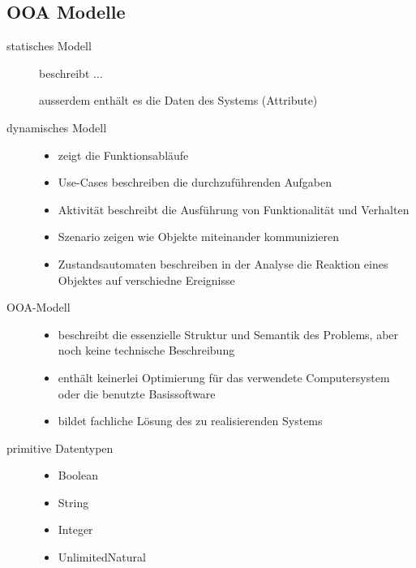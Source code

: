 \subsection{OOA Modelle}
  \begin{description}
    \item[statisches Modell] 
      beschreibt $\ldots$
      ausserdem enthält es die Daten des Systems (Attribute)
     
    \item[dynamisches Modell]
      \begin{itemize}[leftmargin=0.5cm]
        \item zeigt die Funktionsabläufe
        \item Use-Cases beschreiben die durchzuführenden Aufgaben
        \item Aktivität beschreibt die Ausführung von Funktionalität und Verhalten
        \item Szenario zeigen wie Objekte miteinander kommunizieren
        \item Zustandsautomaten beschreiben in der Analyse die Reaktion eines Objektes auf verschiedne Ereignisse
      \end{itemize}
      
    \item[OOA-Modell]
      \begin{itemize}[leftmargin=0.5cm]
        \item beschreibt die essenzielle Struktur und Semantik des Problems, aber noch keine technische Beschreibung
        \item enthält keinerlei Optimierung für das verwendete Computersystem oder die benutzte Basissoftware
        \item bildet fachliche Lösung des zu realisierenden Systems
      \end{itemize}
      
    \item[primitive Datentypen]
      \begin{itemize}[leftmargin=0.5cm]
        \item Boolean
        \item String
        \item Integer
        \item UnlimitedNatural
      \end{itemize}
  \end{description}
  
